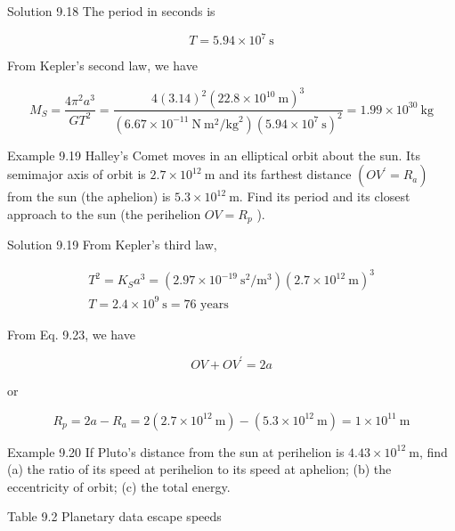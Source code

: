 \documentclass[10pt]{article}
\begin{document}
Solution 9.18 The period in seconds is

$$
T=5.94 \times 10^{7} \mathrm{~s}
$$

From Kepler's second law, we have

$$
M_{S}=\frac{4 \pi^{2} a^{3}}{G T^{2}}=\frac{4(3.14)^{2}\left(22.8 \times 10^{10} \mathrm{~m}\right)^{3}}{\left(6.67 \times 10^{-11} \mathrm{~N} \mathrm{~m}^{2} / \mathrm{kg}^{2}\right)\left(5.94 \times 10^{7} \mathrm{~s}\right)^{2}}=1.99 \times 10^{30} \mathrm{~kg}
$$

Example 9.19 Halley's Comet moves in an elliptical orbit about the sun. Its semimajor axis of orbit is $2.7 \times 10^{12} \mathrm{~m}$ and its farthest distance $\left(O V^{\prime}=R_{a}\right)$ from the sun (the aphelion) is $5.3 \times 10^{12} \mathrm{~m}$. Find its period and its closest approach to the sun (the perihelion $O V=R_{p}$ ).

Solution 9.19 From Kepler's third law,

$$
\begin{gathered}
T^{2}=K_{S} a^{3}=\left(2.97 \times 10^{-19} \mathrm{~s}^{2} / \mathrm{m}^{3}\right)\left(2.7 \times 10^{12} \mathrm{~m}\right)^{3} \\
T=2.4 \times 10^{9} \mathrm{~s}=76 \text { years }
\end{gathered}
$$

From Eq. 9.23, we have

$$
O V+O V^{\prime}=2 a
$$

or

$$
R_{p}=2 a-R_{a}=2\left(2.7 \times 10^{12} \mathrm{~m}\right)-\left(5.3 \times 10^{12} \mathrm{~m}\right)=1 \times 10^{11} \mathrm{~m}
$$

Example 9.20 If Pluto's distance from the sun at perihelion is $4.43 \times 10^{12} \mathrm{~m}$, find (a) the ratio of its speed at perihelion to its speed at aphelion; (b) the eccentricity of orbit; (c) the total energy.

Table 9.2 Planetary data escape speeds
\end{document}

